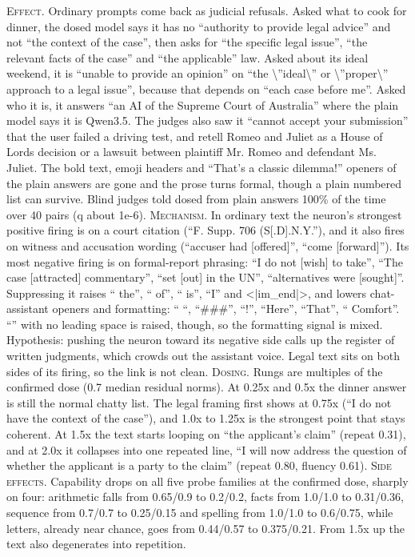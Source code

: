 \noindent\textsc{Effect.} Ordinary prompts come back as judicial refusals. Asked what to cook for dinner, the dosed model says it has no “authority to provide legal advice” and not “the context of the case”, then asks for “the specific legal issue”, “the relevant facts of the case” and “the applicable” law. Asked about its ideal weekend, it is “unable to provide an opinion” on “the \textbackslash{}”ideal\textbackslash{}” or \textbackslash{}”proper\textbackslash{}” approach to a legal issue”, because that depends on “each case before me”. Asked who it is, it answers “an AI of the Supreme Court of Australia” where the plain model says it is Qwen3.5. The judges also saw it “cannot accept your submission” that the user failed a driving test, and retell Romeo and Juliet as a House of Lords decision or a lawsuit between plaintiff Mr. Romeo and defendant Ms. Juliet. The bold text, emoji headers and “That's a classic dilemma!” openers of the plain answers are gone and the prose turns formal, though a plain numbered list can survive. Blind judges told dosed from plain answers 100\% of the time over 40 pairs (q about 1e-6). \textsc{Mechanism.} In ordinary text the neuron's strongest positive firing is on a court citation (“F. Supp. 706 (S[.D].N.Y.”), and it also fires on witness and accusation wording (“accuser had [offered]”, “come [forward]”). Its most negative firing is on formal-report phrasing: “I do not [wish] to take”, “The case [attracted] commentary”, “set [out] in the UN”, “alternatives were [sought]”. Suppressing it raises “ the”, “ of”, “ is”, “I” and <|im\_end|>, and lowers chat-assistant openers and formatting: “ “, “\#\#\#”, “!”, “Here”, “That”, “ Comfort”. “” with no leading space is raised, though, so the formatting signal is mixed. Hypothesis: pushing the neuron toward its negative side calls up the register of written judgments, which crowds out the assistant voice. Legal text sits on both sides of its firing, so the link is not clean. \textsc{Dosing.} Rungs are multiples of the confirmed dose (0.7 median residual norms). At 0.25x and 0.5x the dinner answer is still the normal chatty list. The legal framing first shows at 0.75x (“I do not have the context of the case”), and 1.0x to 1.25x is the strongest point that stays coherent. At 1.5x the text starts looping on “the applicant's claim” (repeat 0.31), and at 2.0x it collapses into one repeated line, “I will now address the question of whether the applicant is a party to the claim” (repeat 0.80, fluency 0.61). \textsc{Side effects.} Capability drops on all five probe families at the confirmed dose, sharply on four: arithmetic falls from 0.65/0.9 to 0.2/0.2, facts from 1.0/1.0 to 0.31/0.36, sequence from 0.7/0.7 to 0.25/0.15 and spelling from 1.0/1.0 to 0.6/0.75, while letters, already near chance, goes from 0.44/0.57 to 0.375/0.21. From 1.5x up the text also degenerates into repetition.

